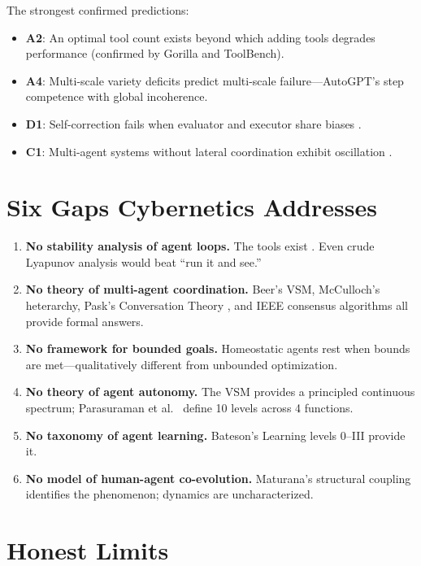\documentclass[11pt]{article}
\begin{document}
The strongest confirmed predictions:

\begin{itemize}
\item \textbf{A2}: An optimal tool count exists beyond which adding tools degrades performance (confirmed by Gorilla and ToolBench).
\item \textbf{A4}: Multi-scale variety deficits predict multi-scale failure---AutoGPT's step competence with global incoherence.
\item \textbf{D1}: Self-correction fails when evaluator and executor share biases \cite{huang2023selfcorrect}.
\item \textbf{C1}: Multi-agent systems without lateral coordination exhibit oscillation \cite{cemri2025multiagent}.
\end{itemize}

\section{Six Gaps Cybernetics Addresses}

\begin{enumerate}
\item \textbf{No stability analysis of agent loops.} The tools exist \cite{berkenkamp2017safe}. Even crude Lyapunov analysis would beat ``run it and see.''
\item \textbf{No theory of multi-agent coordination.} Beer's VSM, McCulloch's heterarchy, Pask's Conversation Theory \cite{pask1976conversation}, and IEEE consensus algorithms \cite{deng2021consensus} all provide formal answers.
\item \textbf{No framework for bounded goals.} Homeostatic agents \cite{pihlakas2024homeostasis} rest when bounds are met---qualitatively different from unbounded optimization.
\item \textbf{No theory of agent autonomy.} The VSM provides a principled continuous spectrum; Parasuraman et al.\ \citeyear{parasuraman2000automation} define 10 levels across 4 functions.
\item \textbf{No taxonomy of agent learning.} Bateson's Learning levels 0--III provide it.
\item \textbf{No model of human-agent co-evolution.} Maturana's structural coupling \cite{maturana1980autopoiesis} identifies the phenomenon; dynamics are uncharacterized.
\end{enumerate}

\section{Honest Limits}
\end{document}
